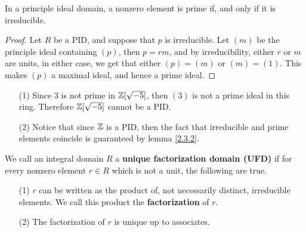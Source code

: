 \begin{lemma}\label{2.3.2}
    In a principle ideal domain, a nonzero element is prime if, and only if it
    is irreducible.
\end{lemma}
\begin{proof}
    Let $R$ be a PID, and suppose that $p$ is irreducible. Let $(m)$ be the
    principle ideal containing $(p)$, then $p=rm$, and by irreducibility, either
     $r$ or $m$ are units, in either case, we get that either $(p)=(m)$ or
     $(m)=(1)$. This makes $(p)$ a maximal ideal, and hence a prime ideal.
\end{proof}

\begin{example}\label{2.7}
    \begin{enumerate}
        \item[(1)] Since $3$ is not prime in  $\mathbb{Z}[\sqrt{-5}]$, then $(3)$ is not
            a prime ideal in this ring. Therefore $\mathbb{Z}[\sqrt{-5}]$ cannot be a
            PID.

        \item[(2)] Notice that since $\mathbb{Z}$ is a PID, then the fact that
            irreducible and prime elements coincide is guaranteed by lemma
            \ref{2.3.2}.
    \end{enumerate}
\end{example}

\begin{definition}
    We call an integral domain $R$ a  \textbf{unique factorization domain (UFD)}
    if for every nonzero element $r \in R$ which is not a unit, the following
    are true.
    \begin{enumerate}
        \item[(1)] $r$ can be written as the product of, not necessarily distinct,
            irreducible elements. We call this product the
            \textbf{factorization} of $r$.

        \item[(2)] The factorization of $r$ is unique up to associates.
    \end{enumerate}
\end{definition}
